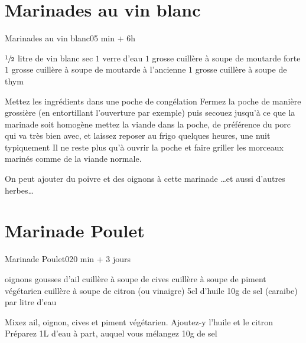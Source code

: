 {\section{Marinades au vin blanc}
\begin{recette}{Marinades au vin blanc}{0}{5 min + 6h}{}
\begin{ingredients}
\ingredient $\sfrac{1}{2}$ litre de vin blanc sec
\ingredient $1$ verre d'eau
\ingredient $1$ grosse cuillère à soupe de moutarde forte
\ingredient $1$ grosse cuillère à soupe de moutarde à l'ancienne
\ingredient $1$ grosse cuillère à soupe de thym
\end{ingredients}

\begin{preparation}
\etape Mettez les ingrédients dans une poche de congélation
\etape Fermez la poche de manière grossière (en entortillant l'ouverture par exemple) puis secouez jusqu'à ce que la marinade 
soit homogène
\etape mettez la viande dans la poche, de préférence du porc qui va très bien avec, et laissez reposer au frigo quelques heures, 
une nuit typiquement
\etape Il ne reste plus qu'à ouvrir la poche et faire griller les morceaux marinés comme de la viande normale.
\end{preparation}

\begin{remarque}
On peut ajouter du poivre et des oignons à cette marinade \dots  et aussi d'autres herbes\dots
\end{remarque}
\end{recette}

\section{Marinade Poulet}
\begin{recette}{Marinade Poulet}{0}{20 min + 3 jours}{}
\begin{ingredients}
 oignons
 gousses d'ail
 cuillère à soupe de cives
 cuillère à soupe de piment végétarien
 cuillère à soupe de citron (ou vinaigre)
\ingredient 5cl d'huile
\ingredient 10g de sel (caraibe) par litre d'eau
\end{ingredients}

\begin{preparation}
\etape Mixez ail, oignon, cives et piment végétarien. Ajoutez-y l'huile et le citron
\etape Préparez 1L d'eau à part, auquel vous mélangez 10g de sel


\end{preparation}
\end{recette}}
